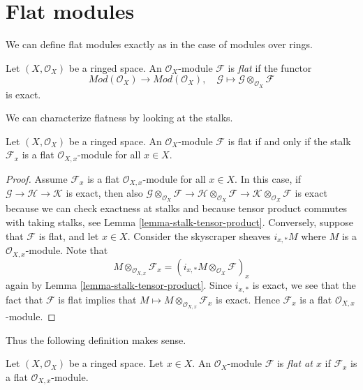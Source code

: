\section{Flat modules}
\label{section-flat}

\noindent
We can define flat modules exactly as in the case of modules over rings.

\begin{definition}
\label{definition-flat}
Let $(X, \mathcal{O}_X)$ be a ringed space.
An $\mathcal{O}_X$-module $\mathcal{F}$ is {\it flat} if the functor
$$
\textit{Mod}(\mathcal{O}_X)
\longrightarrow
\textit{Mod}(\mathcal{O}_X), \quad
\mathcal{G} \mapsto \mathcal{G} \otimes_{\mathcal{O}_X} \mathcal{F}
$$
is exact.
\end{definition}

\noindent
We can characterize flatness by looking at the stalks.

\begin{lemma}
\label{lemma-flat-stalks-flat}
Let $(X, \mathcal{O}_X)$ be a ringed space.
An $\mathcal{O}_X$-module $\mathcal{F}$ is flat
if and only if the stalk $\mathcal{F}_x$ is a flat
$\mathcal{O}_{X, x}$-module for all $x \in X$.
\end{lemma}

\begin{proof}
Assume $\mathcal{F}_x$ is a flat $\mathcal{O}_{X, x}$-module for all
$x \in X$. In this case, if $\mathcal{G} \to \mathcal{H} \to \mathcal{K}$
is exact, then also
$\mathcal{G} \otimes_{\mathcal{O}_X} \mathcal{F} \to
\mathcal{H} \otimes_{\mathcal{O}_X} \mathcal{F} \to
\mathcal{K} \otimes_{\mathcal{O}_X} \mathcal{F}$
is exact because we can check exactness at stalks and because
tensor product commutes with taking stalks, see
Lemma \ref{lemma-stalk-tensor-product}.
Conversely, suppose that $\mathcal{F}$ is flat, and let $x \in X$.
Consider the skyscraper sheaves $i_{x, *} M$ where $M$ is a
$\mathcal{O}_{X, x}$-module. Note that
$$
M \otimes_{\mathcal{O}_{X, x}} \mathcal{F}_x =
\left(i_{x, *} M \otimes_{\mathcal{O}_X} \mathcal{F}\right)_x
$$
again by
Lemma \ref{lemma-stalk-tensor-product}.
Since $i_{x, *}$ is exact, we see that the fact that $\mathcal{F}$
is flat implies that $M \mapsto M \otimes_{\mathcal{O}_{X, x}} \mathcal{F}_x$
is exact. Hence $\mathcal{F}_x$ is a flat $\mathcal{O}_{X, x}$-module.
\end{proof}

\noindent
Thus the following definition makes sense.

\begin{definition}
\label{definition-flat-at-point}
Let $(X, \mathcal{O}_X)$ be a ringed space. Let $x \in X$.
An $\mathcal{O}_X$-module $\mathcal{F}$ is
{\it flat at $x$} if $\mathcal{F}_x$ is a flat
$\mathcal{O}_{X, x}$-module.
\end{definition}

